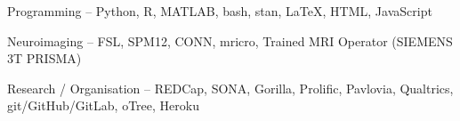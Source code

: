 \datedsubsectionnarrow{}{}
{Programming -- \footnotesize Python, R, MATLAB, bash, stan, \LaTeX, HTML, JavaScript}
{}

\datedsubsectionnarrow{}{}
{Neuroimaging -- \footnotesize FSL, SPM12, CONN, mricro, Trained MRI Operator (SIEMENS 3T PRISMA)}
{}

\datedsubsectionnarrow{}{}
{Research / Organisation -- \footnotesize REDCap, SONA, Gorilla, Prolific, Pavlovia, Qualtrics, git/GitHub/GitLab, oTree, Heroku}
{}